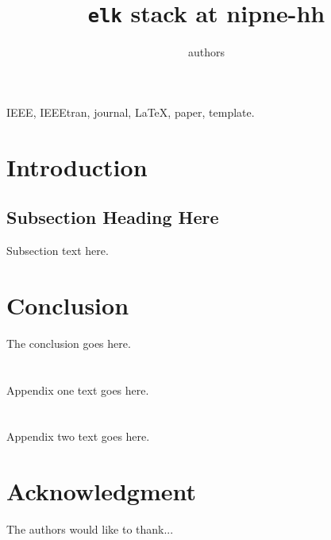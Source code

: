 \documentclass[journal]{IEEEtran}
\begin{document}
\title{\texttt{elk} stack at nipne-hh}
\author{authors}

\maketitle

\begin{abstract}
\lipsum[1]
\end{abstract}

\begin{IEEEkeywords}
IEEE, IEEEtran, journal, \LaTeX, paper, template.
\end{IEEEkeywords}

\IEEEpeerreviewmaketitle

\section{Introduction}
\lipsum[1]

\subsection{Subsection Heading Here}
Subsection text here.
\lipsum[1-2]

\section{Conclusion}
The conclusion goes here.

\appendices
\section{}
Appendix one text goes here.

\section{}
Appendix two text goes here.


\section*{Acknowledgment}
The authors would like to thank...

\ifCLASSOPTIONcaptionsoff
  \newpage
\fi

\end{document}
